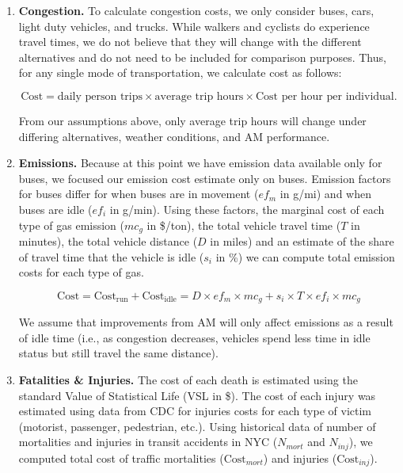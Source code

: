 \documentclass[11pt, letterpaper]{article}
\begin{document}
\begin{enumerate}[leftmargin=*]
\item \textbf{Congestion.}  To calculate congestion costs, we only
  consider
  buses, cars, light duty vehicles, and trucks.  While walkers and
  cyclists do experience travel times, we do not believe that they
  will change with the different alternatives and do not need to be
  included for comparison purposes.  Thus, for any single mode of
  transportation, we calculate cost as follows:
  
  \[\mbox{Cost}=\mbox{daily person trips}\times\mbox{average trip
    hours}\times\mbox{Cost per hour per individual}.\]
  
  From our assumptions above, only average trip hours will change
  under differing alternatives, weather conditions, and AM
  performance.

\item \textbf{Emissions.}  
  Because at this point we have emission data available only for buses, we 
  focused our emission cost estimate only on buses. Emission factors for buses
  differ for when buses are in movement ($ef_m$ in g/mi) and when buses are 
  idle ($ef_{i}$ in g/min). Using these factors, the marginal cost of each type 
  of gas emission ($mc_g$ in \$/ton), the total vehicle travel time ($T$ in minutes), 
  the total vehicle distance ($D$ in miles) and an estimate of the share of travel time that 
  the vehicle is idle ($s_i$ in \%) we can compute total emission costs for each type of gas.

  \[\mbox{Cost}=\mbox{Cost}_{\mbox{run}}+\mbox{Cost}_{\mbox{idle}} = D \times ef_m \times mc_g +  s_i \times T \times  ef_i \times mc_g\]
  
  We assume that improvements from AM will only affect emissions as a result of idle time 
  (i.e., as congestion decreases, vehicles spend less time in idle status but still travel the same distance).
   
\item \textbf{Fatalities \& Injuries.}  
  The cost of each death is estimated using the standard Value of Statistical Life (VSL in \$). The 
  cost of each injury was estimated using data from CDC for injuries costs for each type of victim 
  (motorist, passenger, pedestrian, etc.). Using historical data of number of mortalities and injuries in 
  transit accidents in NYC ($N_{mort}$ and $N_{inj}$), we computed total cost of traffic mortalities 
  ($\mbox{Cost}_{mort}$) and injuries ($\mbox{Cost}_{inj}$).
  

\end{enumerate}
\end{document}

